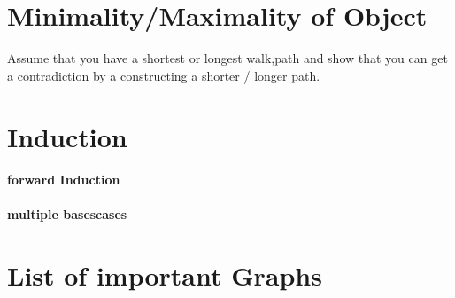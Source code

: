 \documentclass[a4paper]{article}
\begin{document}
\section{Minimality/Maximality of Object}
Assume that you have a shortest or longest walk,path and show that you can 
get a contradiction by a constructing a shorter / longer path.

\section{Induction}
\paragraph{forward Induction}

\paragraph{multiple basescases}


\section{List of important Graphs}
\end{document}
